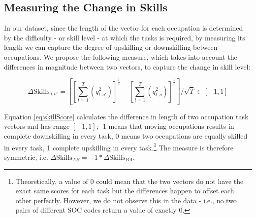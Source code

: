 \documentclass[11pt, oneside]{article}
\begin{document}
	\begin{comment}
	\begin{figure}[H]
	\centering
	\begin{minipage}{.4\textwidth}
	\centering
	\begin{tabular}{lc} %
	& \\
	\end{tabular}
	\end{minipage}
	\begin{minipage}{.4\textwidth}
	\centering
	\begin{tabular}{lc} %
	& \\
	\end{tabular}
	\end{minipage}
	\caption{Quantiles of task similarity of potential occupational moves across (left) and within (right) 1-digit SOC codes (including zeros)}
	\label{fig:angSep_quantile}
	\end{figure}
	\end{comment}
	
	\subsection{Measuring the Change in Skills}
	\label{sec:changeSkillLevel}
	In our dataset, since the length of the vector for each occupation is determined by the difficulty - or skill level - at which the tasks is required, by measuring its length we can capture the degree of upskilling or downskilling between occupations. We propose the following measure, which takes into account the differences in magnitude between two vectors, to capture the change in skill level: 
	
	\begin{equation}
	\label{eq:skillScore}
	\Delta\text{Skills}_{o,o'} = \left[\left[\sum_{t=1}^{T}(q_{t,o'}^{2})\right]^{\frac{1}{2}} - \left[\sum_{t=1}^{T}(q_{t,o}^{2})\right]^{\frac{1}{2}} \right]/\sqrt{T} \in[-1,1]
	\end{equation}
	
	
	\noindent Equation \ref{eq:skillScore} calculates the difference in length of two occupation task vectors and has range $[-1,1]$; -1 means that moving occupations results in complete downskilling in every task, 0 means two occupations are equally skilled in every task, 1 complete upskilling in every task.\footnote{Theoretically, a value of 0 could mean that the two vectors do not have the exact same scores for each task but the differences happen to offset each other perfectly. However, we do not observe this in the data - i.e., no two pairs of different SOC codes return a value of exactly 0. } The measure is therefore symmetric, i.e. $\Delta\text{Skills}_{{A}{B}}  = -1* \Delta\text{Skills}_{{B}{A}}$.
	
\end{document}
